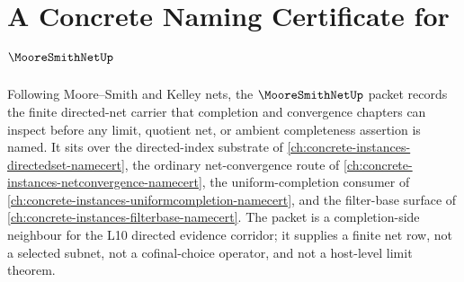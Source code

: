\chapter{A Concrete Naming Certificate for $\MooreSmithNetUp$}
\label{ch:concrete-instances-moore-smith-net-namecert}

Following Moore--Smith and Kelley nets, the $\MooreSmithNetUp$ packet records the finite directed-net carrier that completion and convergence chapters can inspect before any limit, quotient net, or ambient completeness assertion is named. It sits over the directed-index substrate of \autoref{ch:concrete-instances-directedset-namecert}, the ordinary net-convergence route of \autoref{ch:concrete-instances-netconvergence-namecert}, the uniform-completion consumer of \autoref{ch:concrete-instances-uniformcompletion-namecert}, and the filter-base surface of \autoref{ch:concrete-instances-filterbase-namecert}. The packet is a completion-side neighbour for the L10 directed evidence corridor; it supplies a finite net row, not a selected subnet, not a cofinal-choice operator, and not a host-level limit theorem.

